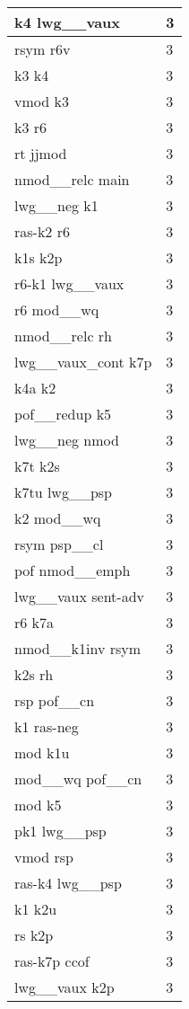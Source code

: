 \documentclass[a4 paper]{article}
\begin{document}
\begin{longtable}{p{}p{}}
k4 lwg\_\_vaux  & 3 \\ \midrule
rsym r6v  & 3 \\ \midrule
k3 k4  & 3 \\ \midrule
vmod k3  & 3 \\ \midrule
k3 r6  & 3 \\ \midrule
rt jjmod  & 3 \\ \midrule
nmod\_\_relc main  & 3 \\ \midrule
lwg\_\_neg k1  & 3 \\ \midrule
ras-k2 r6  & 3 \\ \midrule
k1s k2p  & 3 \\ \midrule
r6-k1 lwg\_\_vaux  & 3 \\ \midrule
r6 mod\_\_wq  & 3 \\ \midrule
nmod\_\_relc rh  & 3 \\ \midrule
lwg\_\_vaux\_cont k7p  & 3 \\ \midrule
k4a k2  & 3 \\ \midrule
pof\_\_redup k5  & 3 \\ \midrule
lwg\_\_neg nmod  & 3 \\ \midrule
k7t k2s  & 3 \\ \midrule
k7tu lwg\_\_psp  & 3 \\ \midrule
k2 mod\_\_wq  & 3 \\ \midrule
rsym psp\_\_cl  & 3 \\ \midrule
pof nmod\_\_emph  & 3 \\ \midrule
lwg\_\_vaux sent-adv  & 3 \\ \midrule
r6 k7a  & 3 \\ \midrule
nmod\_\_k1inv rsym  & 3 \\ \midrule
k2s rh  & 3 \\ \midrule
rsp pof\_\_cn  & 3 \\ \midrule
k1 ras-neg  & 3 \\ \midrule
mod k1u  & 3 \\ \midrule
mod\_\_wq pof\_\_cn  & 3 \\ \midrule
mod k5  & 3 \\ \midrule
pk1 lwg\_\_psp  & 3 \\ \midrule
vmod rsp  & 3 \\ \midrule
ras-k4 lwg\_\_psp  & 3 \\ \midrule
k1 k2u  & 3 \\ \midrule
rs k2p  & 3 \\ \midrule
ras-k7p ccof  & 3 \\ \midrule
lwg\_\_vaux k2p  & 3 \\ \midrule

\end{longtable}
\end{document}
